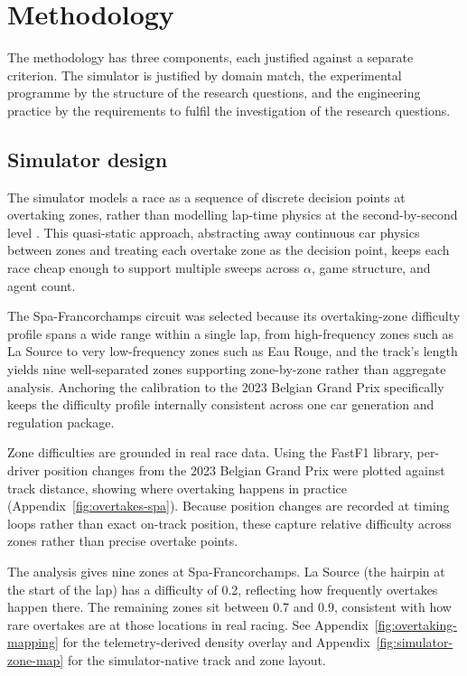 \chapter{Methodology}
\label{chapter2}

The methodology has three components, each justified against a separate criterion. The simulator is justified by domain match, the experimental programme by the structure of the research questions, and the engineering practice by the requirements to fulfil the investigation of the research questions.

\section{Simulator design}
\label{sec:simulator-design}

The simulator models a race as a sequence of discrete decision points at overtaking zones, rather than modelling lap-time physics at the second-by-second level \citep{heilmeier2018racesim}. This quasi-static approach, abstracting away continuous car physics between zones and treating each overtake zone as the decision point, keeps each race cheap enough to support multiple sweeps across $\alpha$, game structure, and agent count.

The Spa-Francorchamps circuit was selected because its overtaking-zone difficulty profile spans a wide range within a single lap, from high-frequency zones such as La Source to very low-frequency zones such as Eau Rouge, and the track's length yields nine well-separated zones supporting zone-by-zone rather than aggregate analysis. Anchoring the calibration to the 2023 Belgian Grand Prix specifically keeps the difficulty profile internally consistent across one car generation and regulation package.

Zone difficulties are grounded in real race data. Using the FastF1 library, per-driver position changes from the 2023 Belgian Grand Prix were plotted against track distance, showing where overtaking happens in practice (Appendix~\ref{fig:overtakes-spa}). Because position changes are recorded at timing loops rather than exact on-track position, these capture relative difficulty across zones rather than precise overtake points.

The analysis gives nine zones at Spa-Francorchamps. La Source (the hairpin at the start of the lap) has a difficulty of 0.2, reflecting how frequently overtakes happen there. The remaining zones sit between 0.7 and 0.9, consistent with how rare overtakes are at those locations in real racing. See Appendix~\ref{fig:overtaking-mapping} for the telemetry-derived density overlay and Appendix~\ref{fig:simulator-zone-map} for the simulator-native track and zone layout.


